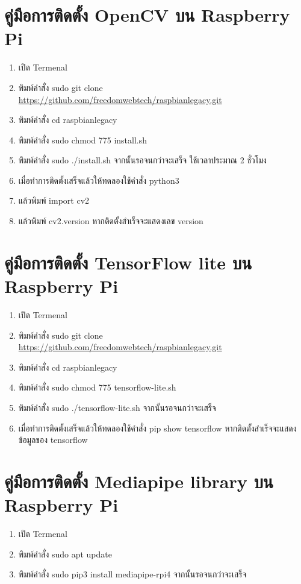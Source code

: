 \section{คู่มือการติดตั้ง OpenCV บน Raspberry Pi}
\begin{enumerate}
  \item เปิด Termenal
  \item พิมพ์คำสั่ง sudo git clone \url{https://github.com/freedomwebtech/raspbianlegacy.git}
  \item พิมพ์คำสั่ง cd raspbianlegacy
  \item พิมพ์คำสั่ง sudo chmod 775 install.sh
  \item พิมพ์คำสั่ง sudo ./install.sh จากนั้นรอจนกว่าจะเสร็จ ใช้เวลาประมาณ 2 ชั่วโมง
  \item เมื่อทำการติดตั้งเสร็จแล้วให้ทดลองใช้คำสั่ง python3
  \item แล้วพิมพ์ import cv2
  \item แล้วพิมพ์ cv2.\textunderscore\textunderscore version \textunderscore\textunderscore หากติดตั้งสำเร็จจะแสดงเลข version
\end{enumerate}

\section{คู่มือการติดตั้ง TensorFlow lite บน Raspberry Pi}
\begin{enumerate}
  \item เปิด Termenal
  \item พิมพ์คำสั่ง sudo git clone \url{https://github.com/freedomwebtech/raspbianlegacy.git}
  \item พิมพ์คำสั่ง cd raspbianlegacy
  \item พิมพ์คำสั่ง sudo chmod 775 tensorflow-lite.sh
  \item พิมพ์คำสั่ง sudo ./tensorflow-lite.sh จากนั้นรอจนกว่าจะเสร็จ
  \item เมื่อทำการติดตั้งเสร็จแล้วให้ทดลองใช้คำสั่ง pip show tensorflow หากติดตั้งสำเร็จจะแสดงข้อมูลของ tensorflow
\end{enumerate}

\section{คู่มือการติดตั้ง Mediapipe library บน Raspberry Pi}
\begin{enumerate}
  \item เปิด Termenal
  \item พิมพ์คำสั่ง sudo apt update
  \item พิมพ์คำสั่ง sudo pip3 install mediapipe-rpi4 จากนั้นรอจนกว่าจะเสร็จ
\end{enumerate}

